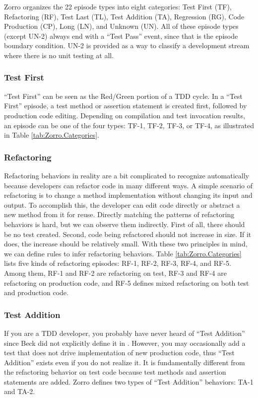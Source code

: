 Zorro organizes the 22 episode types into eight categories: Test First
(TF), Refactoring (RF), Test Last (TL), Test Addition (TA), Regression
(RG), Code Production (CP), Long (LN), and Unknown (UN). All of these
episode types (except UN-2) always end with a ``Test Pass'' event, since 
that is the episode boundary condition.  UN-2 is provided as a way to 
classify a development stream where there is no unit testing at all.

\subsubsection{Test First}
``Test First'' can be seen as the Red/Green portion of a TDD cycle.
In a ``Test First'' episode, a test method or assertion statement is 
created first, followed by production code editing. Depending on 
compilation and test invocation results, an episode can be one of the
four types: TF-1, TF-2, TF-3, or TF-4, as illustrated in 
Table \ref{tab:Zorro.Categories}. 

\subsubsection{Refactoring}
Refactoring behaviors in reality are a bit complicated to recognize 
automatically because developers can refactor code in many different 
ways. A simple scenario of refactoring is to change a method implementation 
without changing its input and output. To accomplish this, the developer 
can edit code directly or abstract a new method from it for reuse. 
Directly matching the patterns of refactoring behaviors is hard, but 
we can observe them indirectly. 
First of all, there should be no test created. Second, code being 
refactored should not increase in size. If it does, the increase 
should be relatively small. With these two principles in mind, we can define
rules to infer refactoring behaviors. Table \ref{tab:Zorro.Categories}
lists five kinds of refactoring episodes: RF-1, RF-2, RF-3, RF-4, and 
RF-5. Among them, RF-1 and RF-2 are refactoring on test, RF-3 and RF-4 
are refactoring on production code, and RF-5 defines mixed refactoring 
on both test and production code. 

\subsubsection{Test Addition}
If you are a TDD developer, you probably have never heard of ``Test Addition''
since Beck did not explicitly define it in \cite{Beck:03}. However,
you may occasionally add a test that does not drive implementation of
new production code, thus ``Test Addition'' exists even if you do not
realize it. It is fundamentally different from the refactoring behavior 
on test code because test methods and assertion statements are added. 
Zorro defines two types of ``Test Addition'' behaviors: TA-1 and TA-2.


